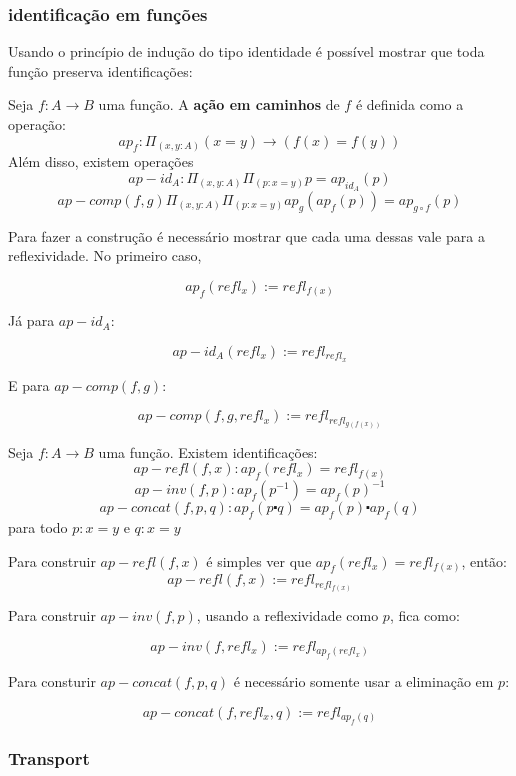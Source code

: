 \documentclass[../main.tex]{subfiles}
\begin{document}
\subsubsection{identificação em funções}

Usando o princípio de indução do tipo identidade é possível mostrar que toda função preserva identificações:

\begin{definition}
    Seja $f : A \to B$ uma função. A \textbf{ação em caminhos} de $f$ é definida como a operação:
    $$ap_f : \Pi_{(x, y : A)} (x = y) \to (f(x) = f(y))$$
    Além disso, existem operações
    $$ap-id_A : \Pi_{(x, y : A)}\Pi_{(p: x = y)} p = ap_{id_A}(p)$$
    $$ap-comp(f, g) \Pi_{(x, y : A)}\Pi_{(p: x = y)} ap_g(ap_f(p)) = ap_{g \circ f}(p)$$
\end{definition}

Para fazer a construção é necessário mostrar que cada uma dessas vale para a reflexividade. No primeiro caso,


$$ap_f (refl_x) := refl_{f(x)}$$

Já para $ap-id_A$:

$$ap-id_A(refl_x) := refl_{refl_x}$$

E para $ap-comp(f, g)$:

$$ap-comp(f, g, refl_x) := refl_{refl_{g(f(x))}}$$

\begin{definition}
    Seja $f : A \to B$ uma função. Existem identificações:
    $$ap-refl(f, x) : ap_f(refl_x) = refl_{f(x)}$$
    $$ap-inv(f, p) : ap_f(p^{-1}) = ap_f(p)^{-1}$$
    $$ap-concat(f, p, q) : ap_f(p \centerdot q) = ap_f(p) \centerdot ap_f(q)$$
    para todo $p: x = y$ e $q : x = y$
\end{definition}

Para construir $ap-refl(f, x)$ é simples ver que $ap_f(refl_x) = refl_{f(x)}$, então:  
$$ap-refl(f, x) := refl_{refl_{f(x)}}$$

Para construir $ap-inv(f, p)$, usando a reflexividade como $p$, fica como:

$$ap-inv(f, refl_x) := refl_{ap_f(refl_x)}$$

Para consturir $ap-concat(f, p, q)$ é necessário somente usar a eliminação em $p$:

$$ap-concat(f, refl_x, q) := refl_{ap_f(q)}$$

\subsubsection{Transport}
\end{document}
